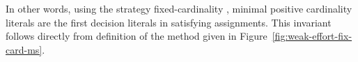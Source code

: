 \documentclass{svjour3}                     %
\begin{document}
In other words, using the strategy fixed-cardinality \checkfcc,
minimal positive cardinality literals are the first decision literals in satisfying assignments.
This invariant follows directly from definition of the method given in Figure~\ref{fig:weak-effort-fix-card-ms}.

\begin{comment}
\begin{lem}
\label{lem:fixed-card-dpllts}
Given a set of ground clauses $F_0$, if $F_0 \wedge \card[\Sigma,k]$ is unsatisfiable,
then every complete execution of fixed-cardinality \checkfcc for $F_0$ 
having a prefix ending in
$\state{M \bullet \card[\Sigma,k], F, \none}$
also has a prefix ending in either a fail state, 
or in $\state{M \ N \neg \card[\Sigma,k], F', \none}$,
where $N$ contains no decision points, and $F \subseteq F'$.
\end{lem}
\begin{proof}
\ar{will revise}
Assume we have an execution $e$ of fixed-cardinality \checkfcc that has a prefix 
ending in state $\state{M \bullet \card[\Sigma,k], F, \none}$ for which the lemma does not hold.
Since fixed-cardinality \checkfcc is complete due to Theorem~\ref{thm:fcc-dpllts-correct}, 
because of the invariant stated in Proposition~\ref{prop:fixed-card-dpllts},
$e$ must be an infinite execution where $\neg \card[\Sigma,k]$ is not in 
the assignment of any state in $e$.
In all such states,
the literals $L_\fcc$ introduced by applications of \learn{i}
consist (at most) of the set of all equalities and disequalities between terms from $F$,
and literals of the form $\card[\So_i,j]$ and $\neg \card[\So_i,j]$ for $j \lt (k-n)$ for each sort $\So_i$ in $\Sigma$.
Since this set is finite, using a similar argument as the one for termination in Theorem~\ref{thm:dpllts-correct}, 
we have that $e$ cannot be infinite, thus contradicting our assumption.
\qed
\end{proof}
\end{comment}
\end{document}
